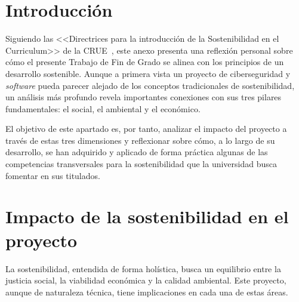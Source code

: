 
%
%

\section{Introducción}

Siguiendo las <<Directrices para la introducción de la Sostenibilidad en el Curriculum>> de la CRUE~\cite{crue}, este anexo presenta una reflexión personal sobre cómo el presente Trabajo de Fin de Grado se alinea con los principios de un desarrollo sostenible. Aunque a primera vista un proyecto de ciberseguridad y \textit{software} pueda parecer alejado de los conceptos tradicionales de sostenibilidad, un análisis más profundo revela importantes conexiones con sus tres pilares fundamentales: el social, el ambiental y el económico.

El objetivo de este apartado es, por tanto, analizar el impacto del proyecto a través de estas tres dimensiones y reflexionar sobre cómo, a lo largo de su desarrollo, se han adquirido y aplicado de forma práctica algunas de las competencias transversales para la sostenibilidad que la universidad busca fomentar en sus titulados.

\section{Impacto de la sostenibilidad en el proyecto}

La sostenibilidad, entendida de forma holística, busca un equilibrio entre la justicia social, la viabilidad económica y la calidad ambiental. Este proyecto, aunque de naturaleza técnica, tiene implicaciones en cada una de estas áreas.

